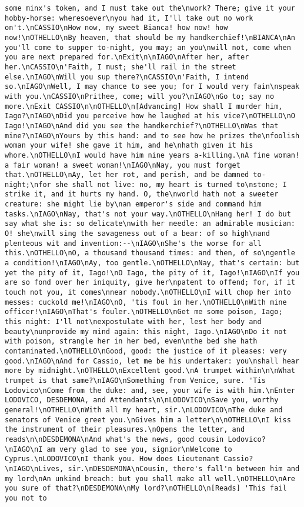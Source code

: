 \begin{verbatim}
some minx's token, and I must take out the\nwork? There; give it your hobby-horse: wheresoever\nyou had it, I'll take out no work on't.\nCASSIO\nHow now, my sweet Bianca! how now! how now!\nOTHELLO\nBy heaven, that should be my handkerchief!\nBIANCA\nAn you'll come to supper to-night, you may; an you\nwill not, come when you are next prepared for.\nExit\n\nIAGO\nAfter her, after her.\nCASSIO\n'Faith, I must; she'll rail in the street else.\nIAGO\nWill you sup there?\nCASSIO\n'Faith, I intend so.\nIAGO\nWell, I may chance to see you; for I would very fain\nspeak with you.\nCASSIO\nPrithee, come; will you?\nIAGO\nGo to; say no more.\nExit CASSIO\n\nOTHELLO\n[Advancing] How shall I murder him, Iago?\nIAGO\nDid you perceive how he laughed at his vice?\nOTHELLO\nO Iago!\nIAGO\nAnd did you see the handkerchief?\nOTHELLO\nWas that mine?\nIAGO\nYours by this hand: and to see how he prizes the\nfoolish woman your wife! she gave it him, and he\nhath given it his whore.\nOTHELLO\nI would have him nine years a-killing.\nA fine woman! a fair woman! a sweet woman!\nIAGO\nNay, you must forget that.\nOTHELLO\nAy, let her rot, and perish, and be damned to-night;\nfor she shall not live: no, my heart is turned to\nstone; I strike it, and it hurts my hand. O, the\nworld hath not a sweeter creature: she might lie by\nan emperor's side and command him tasks.\nIAGO\nNay, that's not your way.\nOTHELLO\nHang her! I do but say what she is: so delicate\nwith her needle: an admirable musician: O! she\nwill sing the savageness out of a bear: of so high\nand plenteous wit and invention:--\nIAGO\nShe's the worse for all this.\nOTHELLO\nO, a thousand thousand times: and then, of so\ngentle a condition!\nIAGO\nAy, too gentle.\nOTHELLO\nNay, that's certain: but yet the pity of it, Iago!\nO Iago, the pity of it, Iago!\nIAGO\nIf you are so fond over her iniquity, give her\npatent to offend; for, if it touch not you, it comes\nnear nobody.\nOTHELLO\nI will chop her into messes: cuckold me!\nIAGO\nO, 'tis foul in her.\nOTHELLO\nWith mine officer!\nIAGO\nThat's fouler.\nOTHELLO\nGet me some poison, Iago; this night: I'll not\nexpostulate with her, lest her body and beauty\nunprovide my mind again: this night, Iago.\nIAGO\nDo it not with poison, strangle her in her bed, even\nthe bed she hath contaminated.\nOTHELLO\nGood, good: the justice of it pleases: very good.\nIAGO\nAnd for Cassio, let me be his undertaker: you\nshall hear more by midnight.\nOTHELLO\nExcellent good.\nA trumpet within\n\nWhat trumpet is that same?\nIAGO\nSomething from Venice, sure. 'Tis Lodovico\nCome from the duke: and, see, your wife is with him.\nEnter LODOVICO, DESDEMONA, and Attendants\n\nLODOVICO\nSave you, worthy general!\nOTHELLO\nWith all my heart, sir.\nLODOVICO\nThe duke and senators of Venice greet you.\nGives him a letter\n\nOTHELLO\nI kiss the instrument of their pleasures.\nOpens the letter, and reads\n\nDESDEMONA\nAnd what's the news, good cousin Lodovico?\nIAGO\nI am very glad to see you, signior\nWelcome to Cyprus.\nLODOVICO\nI thank you. How does Lieutenant Cassio?\nIAGO\nLives, sir.\nDESDEMONA\nCousin, there's fall'n between him and my lord\nAn unkind breach: but you shall make all well.\nOTHELLO\nAre you sure of that?\nDESDEMONA\nMy lord?\nOTHELLO\n[Reads] 'This fail you not to 
\end{verbatim}
